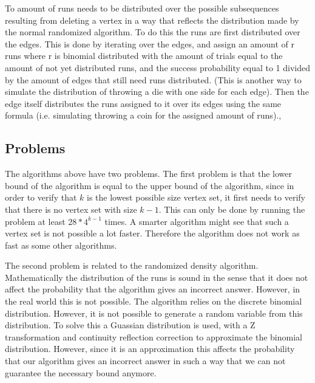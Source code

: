 To amount of runs needs to be distributed over the possible subsequences resulting from deleting a vertex in a way that reflects the distribution made by the normal randomized algorithm. To do this the runs are first distributed over the edges. This is done by iterating over the edges, and assign an amount of r runs where r is binomial distributed with the amount of trials equal to the amount of not yet distributed runs, and the success probability equal to 1 divided by the amount of edges that still need runs distributed. (This is another way to simulate the distribution of throwing a die with one side for each edge). Then the edge itself distributes the runs assigned to it over its edges using the same formula (i.e. simulating throwing a coin for the assigned amount of runs).,

\subsection{Problems}
The algorithms above have two problems. The first problem is that the lower bound of the algorithm is equal to the upper bound of the algorithm, since in order to verify that $k$ is the lowest possible size vertex set, it first needs to verify that there is no vertex set with size $k-1$. This can only be done by running the problem at least $28*4^{k -1}$ times. A smarter algorithm might see that such a vertex set is not possible a lot faster. Therefore the algorithm does not work as fast as some other algorithms.

The second problem is related to the randomized density algorithm. Mathematically the distribution of the runs is sound in the sense that it does not affect the probability that the algorithm gives an incorrect answer. However, in the real world this is not possible. The algorithm relies on the discrete binomial distribution. However, it is not possible to generate a random variable from this distribution. To solve this a Guassian distribution is used, with a Z transformation and continuity reflection correction to approximate the binomial distribution. However, since it is an approximation this affects the probability that our algorithm gives an incorrect answer in such a way that we can not guarantee the necessary bound anymore. 